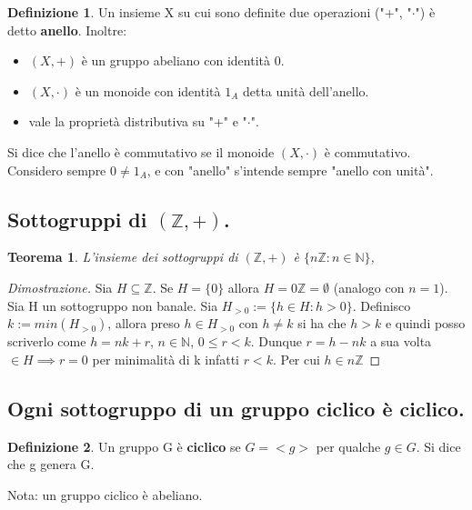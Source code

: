 \documentclass{article}
\theoremstyle{definition}
\newtheorem{definizione}{Definizione}
\theoremstyle{plain}
\theoremstyle{plain}
\theoremstyle{plain}
\newtheorem{teorema}{Teorema}
\theoremstyle{plain}
\begin{document}
\begin{definizione}
    Un insieme X su cui sono definite due operazioni ("+", "$\cdot$") è detto \textbf{anello}. Inoltre:
    \begin{itemize}
        \item $(X, +)$ è un gruppo abeliano con identità $0$.
        \item $(X, \cdot)$ è un monoide con identità $1_A$ detta unità dell'anello.
        \item vale la proprietà distributiva su "+" e "$\cdot$".
    \end{itemize}
    Si dice che l'anello è commutativo se il monoide $(X, \cdot)$ è commutativo.
    Considero sempre $0 \neq 1_A$, e con "anello" s'intende sempre "anello con unità".
\end{definizione}

\subsection{Sottogruppi di $(\mathbb{Z}, +)$.}
\begin{teorema}\label{teo: sott_z}
    L'insieme dei sottogruppi di $(\mathbb{Z}, +)$ è $\{n\mathbb{Z} : n \in \mathbb{N}\}$,
\end{teorema}
\begin{proof}[Dimostrazione]
    Sia $H \subseteq \mathbb{Z}$.
    Se $H = \{0\}$ allora $H = 0\mathbb{Z} = \emptyset$ (analogo con $n=1$). \newline
    Sia H un sottogruppo non banale. 
    Sia $H_{>0} := \{h \in H : h > 0\}$. Definisco $k:= min(H_{>0})$, allora preso $h \in H_{>0}$ con $h \neq k$ si ha che $h > k$ e quindi posso scriverlo come $h = nk + r$, $n \in \mathbb{N}$, $0 \le r < k$.
    Dunque $r = h-nk$ a sua volta $\in H \implies r = 0$ per minimalità di k infatti $ r < k $. Per cui $h \in n \mathbb{Z}$
\end{proof}

\subsection{Ogni sottogruppo di un gruppo ciclico è ciclico.}
\begin{definizione}
    Un gruppo G è \textbf{ciclico} se $G = <g>$ per qualche $g \in G$. Si dice che g genera G.
\end{definizione}
Nota: un gruppo ciclico è abeliano.
\end{document}
